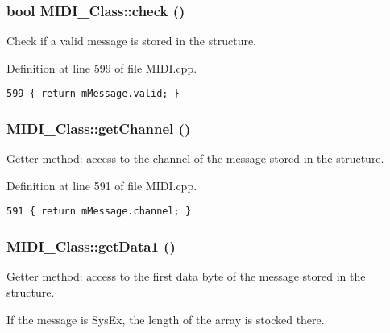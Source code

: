 \hypertarget{class_m_i_d_i___class_d5f7a96c5bb338946a0be1d243877155}{
\subsubsection[{check}]{\setlength{\rightskip}{0pt plus 5cm}bool MIDI\_\-Class::check ()}}
\label{class_m_i_d_i___class_d5f7a96c5bb338946a0be1d243877155}


Check if a valid message is stored in the structure. 

Definition at line 599 of file MIDI.cpp.

\begin{Code}\begin{verbatim}599 { return mMessage.valid; }
\end{verbatim}
\end{Code}


\hypertarget{class_m_i_d_i___class_6b7ac8309663b69decfd1bd2925fcbef}{
\subsubsection[{getChannel}]{ MIDI\_\-Class::getChannel ()}}
\label{class_m_i_d_i___class_6b7ac8309663b69decfd1bd2925fcbef}


Getter method: access to the channel of the message stored in the structure. 

Definition at line 591 of file MIDI.cpp.

\begin{Code}\begin{verbatim}591 { return mMessage.channel; }
\end{verbatim}
\end{Code}


\hypertarget{class_m_i_d_i___class_a64038c767252e358decc469ba99d4e3}{
\subsubsection[{getData1}]{ MIDI\_\-Class::getData1 ()}}
\label{class_m_i_d_i___class_a64038c767252e358decc469ba99d4e3}


Getter method: access to the first data byte of the message stored in the structure. \par
 If the message is SysEx, the length of the array is stocked there. 

